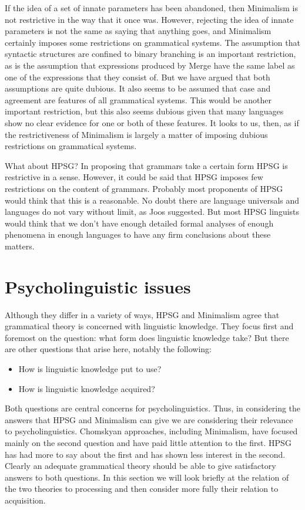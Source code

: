 \documentclass[output=paper]{langsci/langscibook}
\begin{document}
If the idea of a set of innate parameters has been abandoned, then Minimalism is not restrictive in the way that it once was. However, rejecting the idea of innate parameters is not the same as saying that anything goes, and Minimalism certainly imposes some restrictions on grammatical systems. The assumption that syntactic structures are confined to binary branching is an important restriction, as is the assumption that expressions produced by Merge have the same label as one of the expressions that they consist of. But we have argued that both assumptions are quite dubious. It also seems to be assumed that case and agreement are features of all grammatical systems. This would be another important restriction, but this also seems dubious given that many languages show no clear evidence for one or both of these features. It looks to us, then, as if the restrictiveness of Minimalism is largely a matter of imposing dubious restrictions on grammatical systems.

What about HPSG? In proposing that grammars take a certain form HPSG is restrictive in a sense. However, it could be said that HPSG imposes few restrictions on the content of grammars. Probably most proponents of HPSG would think that this is a reasonable. No doubt there are language universals and languages do not vary without limit, as Joos suggested. But most HPSG linguists would think that we don't have enough detailed formal analyses of enough phenomena in enough languages to have any firm conclusions about these matters.


\section{Psycholinguistic issues}

Although they differ in a variety of ways, HPSG and Minimalism agree that grammatical theory is
concerned with linguistic knowledge. They focus first and foremost on the question: what form does
linguistic knowledge take? But there are other questions that arise here, notably the following: 

\begin{itemize}
\item How is linguistic knowledge put to use? 
\item How is linguistic knowledge acquired?
\end{itemize}

Both questions are central concerns for psycholinguistics. Thus, in considering the answers that
HPSG and Minimalism can give we are considering their relevance to psycholinguistics. Chomskyan
approaches, including Minimalism, have focused mainly on the second question and have paid little
attention to the first. HPSG has had more to say about the first and has shown less interest in the
second. Clearly an adequate grammatical theory should be able to give satisfactory answers to both
questions. In this section we will look briefly at the relation of the two theories to processing
and then consider more fully their relation to acquisition.
\end{document}
